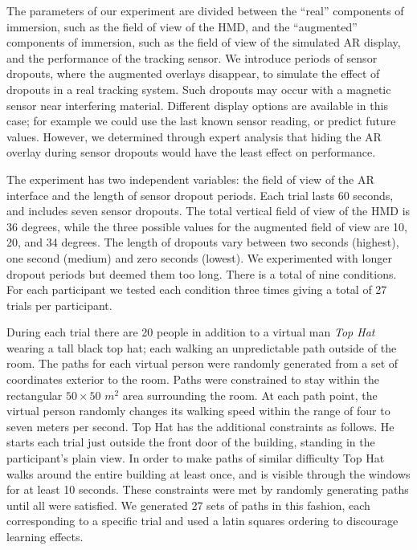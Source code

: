 \documentclass{acmsiggraph}                     %
\begin{document}
The parameters of our experiment are divided between the ``real'' components of immersion, such as the field of view of the HMD, and the ``augmented'' components of immersion, such as the field of view of the simulated AR display, and the performance of the tracking sensor.  We introduce periods of sensor dropouts, where the augmented overlays disappear, to simulate the effect of dropouts in a real tracking system.  Such dropouts may occur with a magnetic sensor near interfering material.  Different display options are available in this case; for example we could use the last known sensor reading, or predict future values.
However, we determined through expert analysis that hiding the AR overlay during sensor dropouts would have the least effect on performance.

The experiment has two independent variables: the field of view of the AR interface and the length of sensor dropout periods.  Each trial lasts 60 seconds, and includes seven sensor dropouts.  The total vertical field of view of the HMD is 36 degrees, while the three possible values for the augmented field of view are 10, 20, and 34 degrees.  The length of dropouts vary between two seconds (highest), one second (medium) and zero seconds (lowest).  We experimented with longer dropout periods but deemed them too long.  There is a total of nine conditions.  For each participant we tested each condition three times giving a total of 27 trials per participant.

During each trial there are 20 people in addition to a virtual man \emph{Top Hat} wearing a tall black top hat; each walking an unpredictable path outside of the room.  The paths for each virtual person were randomly generated from a set of coordinates exterior to the room.  Paths were constrained to stay within the rectangular $50\times50$ $m^2$ area surrounding the room.  At each path point, the virtual person randomly changes its walking speed within the range of four to seven meters per second.
Top Hat has the additional constraints as follows.  He starts each trial just outside the front door of the building, standing in the participant's plain view.  In order to make paths of similar difficulty Top Hat walks around the entire building at least once, and is visible through the windows for at least 10 seconds.  These constraints were met by randomly generating paths until all were satisfied.  We generated 27 sets of paths in this fashion, each corresponding to a specific trial and used a latin squares ordering to discourage learning effects.
\end{document}
